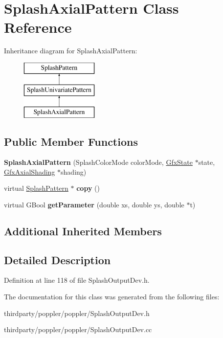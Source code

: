 \hypertarget{class_splash_axial_pattern}{}\section{Splash\+Axial\+Pattern Class Reference}
\label{class_splash_axial_pattern}
Inheritance diagram for Splash\+Axial\+Pattern\+:\begin{figure}[H]
\begin{center}
\leavevmode
\includegraphics[height=3.000000cm]{class_splash_axial_pattern}
\end{center}
\end{figure}
\subsection*{Public Member Functions}
\begin{DoxyCompactItemize}
\item 
\mbox{\label{class_splash_axial_pattern_a7f6fe29cfa0b3854a9b336f592874a4c}} 
{\bfseries Splash\+Axial\+Pattern} (Splash\+Color\+Mode color\+Mode, \hyperlink{class_gfx_state}{Gfx\+State} $\ast$state, \hyperlink{class_gfx_axial_shading}{Gfx\+Axial\+Shading} $\ast$shading)
\item 
\mbox{\label{class_splash_axial_pattern_ac68c179fc7473cc0cc6c3ab608e8ade3}} 
virtual \hyperlink{class_splash_pattern}{Splash\+Pattern} $\ast$ {\bfseries copy} ()
\item 
\mbox{\label{class_splash_axial_pattern_abcf0d2761282a5eb4cdca3cd99bb0a4e}} 
virtual G\+Bool {\bfseries get\+Parameter} (double xs, double ys, double $\ast$t)
\end{DoxyCompactItemize}
\subsection*{Additional Inherited Members}


\subsection{Detailed Description}


Definition at line 118 of file Splash\+Output\+Dev.\+h.



The documentation for this class was generated from the following files\+:\begin{DoxyCompactItemize}
\item 
thirdparty/poppler/poppler/Splash\+Output\+Dev.\+h\item 
thirdparty/poppler/poppler/Splash\+Output\+Dev.\+cc\end{DoxyCompactItemize}
